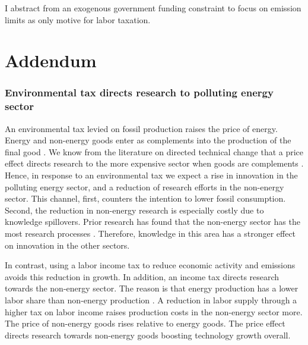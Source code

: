 \documentclass[12pt]{article}
\begin{document}
\begin{enumerate}
I abstract from an exogenous government funding constraint to focus on emission limits as only motive for labor taxation. 
\appendix
\section*{Addendum}
\subsubsection*{Environmental tax directs research to polluting energy sector}\label{sec:mec}
An environmental tax levied on fossil production raises the price of energy. Energy and non-energy goods enter as complements into the production of the final good \citep{Hassler2016EnvironmentalMacroeconomics, Fried2018ClimateAnalysis}. We know from the literature on directed technical change that a price effect  directs research to the more expensive sector when goods are complements \citep{Acemoglu2002DirectedChange, Hemous2021DirectedEconomics}. Hence, in response to an environmental tax we expect a rise in innovation in the polluting energy sector, and a reduction of research efforts in the non-energy sector.
This channel, first, counters the intention to lower fossil consumption. Second, the reduction in non-energy research is especially costly due to knowledge spillovers. Prior research has found that the non-energy sector has the most research processes \citep{Fried2018ClimateAnalysis}. Therefore, knowledge in this area has a stronger effect on innovation in the other sectors.  

In contrast, using a labor income tax to reduce economic activity and emissions avoids this reduction in growth. In addition, an income tax directs research towards the non-energy sector. The reason is that energy production has a lower labor share than non-energy production \citep{Fried2018ClimateAnalysis}. A reduction in labor supply through a higher tax on labor income raises production costs in the non-energy sector more. The price of non-energy goods rises relative to energy goods. The price effect directs research towards non-energy goods boosting technology growth overall. 
\end{enumerate}
\end{document}
